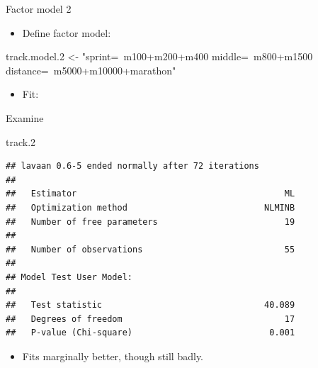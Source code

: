 \documentclass[ignorenonframetext,]{beamer}
\newenvironment{Shaded}{\begin{snugshade}}{\end{snugshade}}
\newcommand{\DataTypeTok}[1]{\textcolor[rgb]{0.13,0.29,0.53}{#1}}
\newcommand{\FloatTok}[1]{\textcolor[rgb]{0.00,0.00,0.81}{#1}}
\newcommand{\KeywordTok}[1]{\textcolor[rgb]{0.13,0.29,0.53}{\textbf{#1}}}
\newcommand{\NormalTok}[1]{#1}
\newcommand{\OperatorTok}[1]{\textcolor[rgb]{0.81,0.36,0.00}{\textbf{#1}}}
\newcommand{\StringTok}[1]{\textcolor[rgb]{0.31,0.60,0.02}{#1}}
\providecommand{\tightlist}{%
  \setlength{\itemsep}{0pt}\setlength{\parskip}{0pt}}
\begin{document}
\begin{frame}[fragile]{Factor model 2}
\protect\hypertarget{factor-model-2}{}

\begin{itemize}
\tightlist
\item
  Define factor model:
\end{itemize}

\begin{Shaded}
\begin{Highlighting}[]
\NormalTok{track.model}\FloatTok{.2}\NormalTok{ <-}\StringTok{ "sprint=~m100+m200+m400}
\StringTok{                  middle=~m800+m1500}
\StringTok{                  distance=~m5000+m10000+marathon"}
\end{Highlighting}
\end{Shaded}

\begin{itemize}
\tightlist
\item
  Fit:
\end{itemize}

\begin{Shaded}
\end{Shaded}

\end{frame}

\begin{frame}[fragile]{Examine}
\protect\hypertarget{examine}{}

\begin{Shaded}
\begin{Highlighting}[]
\NormalTok{track}\FloatTok{.2}
\end{Highlighting}
\end{Shaded}

\begin{verbatim}
## lavaan 0.6-5 ended normally after 72 iterations
## 
##   Estimator                                         ML
##   Optimization method                           NLMINB
##   Number of free parameters                         19
##                                                       
##   Number of observations                            55
##                                                       
## Model Test User Model:
##                                                       
##   Test statistic                                40.089
##   Degrees of freedom                                17
##   P-value (Chi-square)                           0.001
\end{verbatim}

\begin{itemize}
\tightlist
\item
  Fits marginally better, though still badly.
\end{itemize}

\end{frame}
\end{document}
